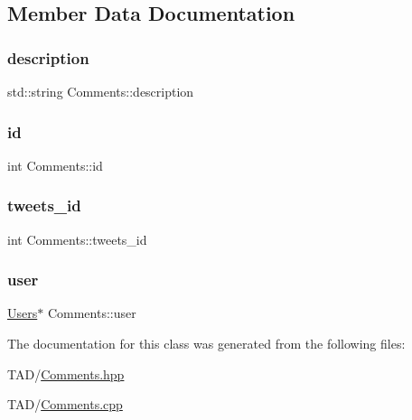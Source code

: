 \subsection{Member Data Documentation}
\mbox{\label{class_comments_ad4073ce0c82aca8455a0ffe4170d03ec}} 
\subsubsection{\texorpdfstring{description}{description}}
{\footnotesize\ttfamily std\+::string Comments\+::description\hspace{0.3cm}{\ttfamily [private]}}

\mbox{\label{class_comments_a62aa986c551ebac090962ab38b3841d6}} 
\subsubsection{\texorpdfstring{id}{id}}
{\footnotesize\ttfamily int Comments\+::id\hspace{0.3cm}{\ttfamily [private]}}

\mbox{\label{class_comments_a024beb18bc87f76a1484f9edd4a64678}} 
\subsubsection{\texorpdfstring{tweets\+\_\+id}{tweets\_id}}
{\footnotesize\ttfamily int Comments\+::tweets\+\_\+id\hspace{0.3cm}{\ttfamily [private]}}

\mbox{\label{class_comments_a8e0c8129a99373132b6a182fc817495f}} 
\subsubsection{\texorpdfstring{user}{user}}
{\footnotesize\ttfamily \hyperlink{class_users}{Users}$\ast$ Comments\+::user\hspace{0.3cm}{\ttfamily [private]}}



The documentation for this class was generated from the following files\+:\begin{DoxyCompactItemize}
\item 
T\+A\+D/\hyperlink{_comments_8hpp}{Comments.\+hpp}\item 
T\+A\+D/\hyperlink{_comments_8cpp}{Comments.\+cpp}\end{DoxyCompactItemize}
